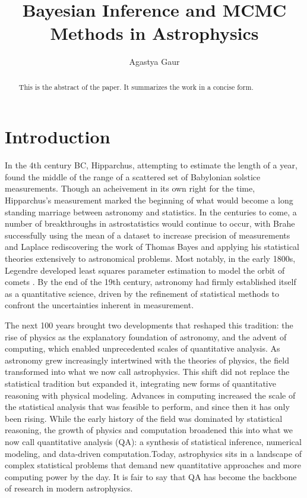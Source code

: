 \documentclass[twocolumn,linenumbers]{aastex631}
\begin{document}
\title{Bayesian Inference and MCMC Methods in Astrophysics}
\author{Agastya Gaur}

\begin{abstract}
  This is the abstract of the paper. It summarizes the work in a concise form.
\end{abstract}

\tableofcontents

\section{Introduction}
In the 4th century BC, Hipparchus, attempting to estimate the length of a year, found the middle of the range of a scattered set of Babylonian solstice measurements. Though an acheivement in its own right for the time, Hipparchus's measurement marked the beginning of what would become a long standing marriage between astronomy and statistics. In the centuries to come, a number of breakthroughs in astrostatistics would continue to occur, with Brahe successfully using the mean of a dataset to increase precision of measurements and Laplace rediscovering the work of Thomas Bayes and applying his statistical theories extensively to astronomical problems. Most notably, in the early 1800s, Legendre developed least squares parameter estimation to model the orbit of comets \citep{feigelsonStatisticalChallengesModern2003}. By the end of the 19th century, astronomy had firmly established itself as a quantitative science, driven by the refinement of statistical methods to confront the uncertainties inherent in measurement.

The next 100 years brought two developments that reshaped this tradition: the rise of physics as the explanatory foundation of astronomy, and the advent of computing, which enabled unprecedented scales of quantitative analysis. As astronomy grew increasingly intertwined with the theories of physics, the field transformed into what we now call astrophysics. This shift did not replace the statistical tradition but expanded it, integrating new forms of quantitative reasoning with physical modeling. Advances in computing increased the scale of the statistical analysis that was feasible to perform, and since then it has only been rising. While the early history of the field was dominated by statistical reasoning, the growth of physics and computation broadened this into what we now call quantitative analysis (QA): a synthesis of statistical inference, numerical modeling, and data-driven computation.Today, astrophysics sits in a landscape of complex statistical problems that demand new quantitative approaches and more computing power by the day. It is fair to say that QA has become the backbone of research in modern astrophysics.


\end{document}

